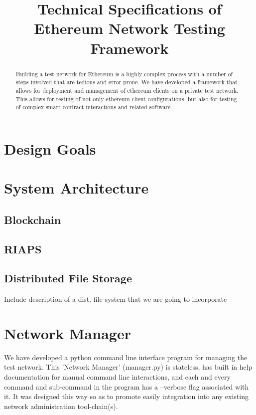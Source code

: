 \documentclass[]{article}
\title{Technical Specifications of\\ Ethereum Network Testing Framework}
\author{}
\begin{document}
\maketitle

\begin{abstract}

Building a test network for Ethereum is a highly complex process with a number of steps involved that are tedious and error prone. We have developed a framework that allows for deployment and management of ethereum clients on a private test network. This allows for testing of not only ethereum client configurations, but also for testing of complex smart contract interactions and related software.

\end{abstract}

\section{Design Goals}

\section{System Architecture}

\subsection{Blockchain}

\subsection{RIAPS}

\subsection{Distributed File Storage}
Include description of a dist. file system that we are going to incorporate 

\section{Network Manager}

We have developed a python command line interface program for managing the test network. This 'Network Manager' (manager.py) is stateless, has built in help documentation for manual command line interactions, and each and every command and sub-command in the program has a --verbose flag associated with it. It was designed this way so as to promote easily integration into any existing network administration tool-chain(s). 
\end{document}
